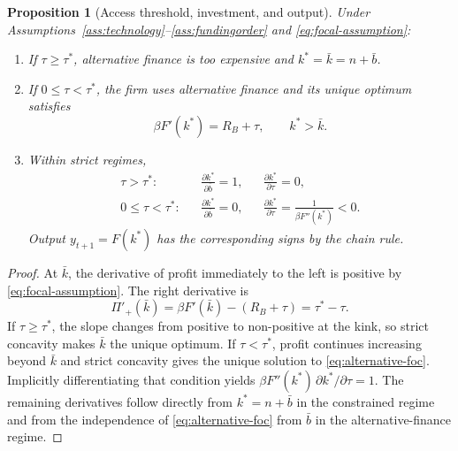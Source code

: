 \documentclass[11pt]{article}
\newtheorem{proposition}{Proposition}
\theoremstyle{definition}
\theoremstyle{remark}
\newcommand{\Rb}{R_B}
\begin{document}
\begin{proposition}[Access threshold, investment, and output]\label{prop:regimes}
Under Assumptions~\ref{ass:technology}--\ref{ass:fundingorder} and
\eqref{eq:focal-assumption}:
\begin{enumerate}[label=(\roman*)]
\item If $\tau\ge\tau^*$, alternative finance is too expensive and
$k^*=\bar k=n+\bar b$.
\item If $0\le\tau<\tau^*$, the firm uses alternative finance and its unique
optimum satisfies
\begin{equation}\label{eq:alternative-foc}
\beta F'(k^*)=\Rb+\tau,\qquad k^*>\bar k.
\end{equation}
\item Within strict regimes,
\begin{align}
\tau>\tau^*:
&&\frac{\partial k^*}{\partial\bar b}=1,
&&\frac{\partial k^*}{\partial\tau}=0,
\label{eq:quantityeffects}\\
0\le\tau<\tau^*:
&&\frac{\partial k^*}{\partial\bar b}=0,
&&\frac{\partial k^*}{\partial\tau}
=\frac{1}{\beta F''(k^*)}<0.
\label{eq:priceeffects-general}
\end{align}
Output $y_{t+1}=F(k^*)$ has the corresponding signs by the chain rule.
\end{enumerate}
\end{proposition}

\begin{proof}
At $\bar k$, the derivative of profit immediately to the left is positive by
\eqref{eq:focal-assumption}. The right derivative is
\[
\Pi'_+(\bar k)=\beta F'(\bar k)-(\Rb+\tau)=\tau^*-\tau.
\]
If $\tau\ge\tau^*$, the slope changes from positive to non-positive at the
kink, so strict concavity makes $\bar k$ the unique optimum. If
$\tau<\tau^*$, profit continues increasing beyond $\bar k$ and strict
concavity gives the unique solution to \eqref{eq:alternative-foc}. Implicitly
differentiating that condition yields
$\beta F''(k^*)\,\partial k^*/\partial\tau=1$. The remaining derivatives
follow directly from $k^*=n+\bar b$ in the constrained regime and from the
independence of \eqref{eq:alternative-foc} from $\bar b$ in the
alternative-finance regime.
\end{proof}
\end{document}

